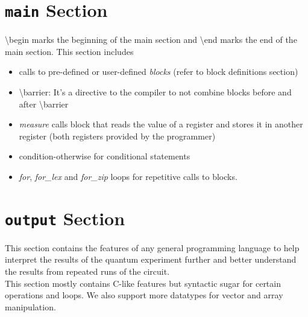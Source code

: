 \section{\texttt{main} Section}                                                                                                                                                              
    \textbackslash begin marks the beginning of the main section and \textbackslash end marks the end of the main section. This section includes                                               
    \begin{itemize}                                                                                                                                                                            
        \item calls to pre-defined or user-defined  \emph{blocks} (refer to block definitions section)                                                                                         
        \item \textbackslash barrier: It's a directive to the compiler to not combine blocks before and after \textbackslash barrier                                                           
        \item  \emph{measure} calls block that reads the value of a register and stores it in another register (both registers provided by the programmer)                                     
        \item condition-otherwise for conditional statements                                                                                                                                   
        \item  \emph{for},  \emph{for\_lex} and \emph{for\_zip} loops for repetitive calls to blocks.                                                                                          
    \end{itemize}     
        
\section{\texttt{output} Section}
    This section contains the features of any general programming language to help interpret the results of the quantum experiment further and better understand the results from 
    repeated runs of the circuit. \\
    This section mostly contains C-like features but syntactic sugar for certain operations and loops. We also support more datatypes for vector and array manipulation.
                                                                                                                                                                                                   
                                                                                                                                                                                                   
